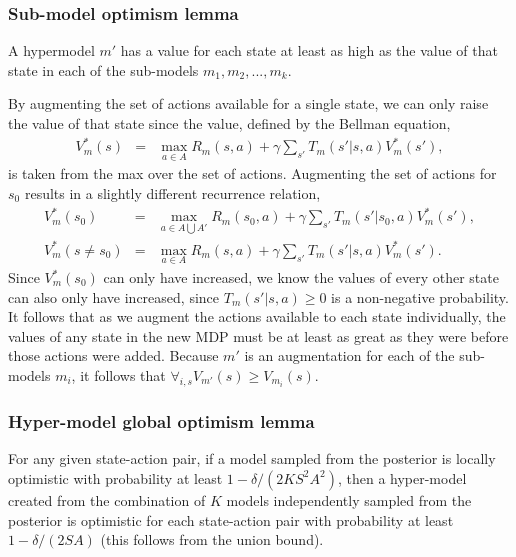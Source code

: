 \subsubsection{Sub-model optimism lemma}

\label{sec:boss:sub-model-optimism}


A hypermodel $m'$ has a value for each state at least as high as the value of that state in each of the sub-models $m_1, m_2, ..., m_k$.

By augmenting the set of actions available for a single state, we can only raise the value of that state since the value, defined by the Bellman equation,
\begin{eqnarray}
V^*_m(s) &=& \max_{a \in A} R_m(s,a)+\gamma \sum_{s'} T_m(s'|s,a)V^*_m(s'),
\end{eqnarray}
is taken from the max over the set of actions. Augmenting the set of actions for $s_0$ results in a slightly different recurrence relation,
\begin{eqnarray}
V^*_m(s_0) &=& \max_{a \in A \bigcup A'} R_m(s_0,a)+\gamma \sum_{s'} T_m(s'|s_0,a)V^*_m(s'),\\
V^*_m(s\neq s_0) &=& \max_{a \in A} R_m(s,a)+\gamma \sum_{s'} T_m(s'|s,a)V^*_m(s').
\end{eqnarray}
Since $V^*_m(s_0)$ can only have increased, we  know the values of every other state can also only have increased, since $T_m(s'|s,a) \geq 0$ is a non-negative probability. It follows that as we augment the actions available to each state individually, the values of any state in the new MDP must be at least as great as they were before those actions were added. Because $m'$ is an augmentation for each of the sub-models $m_i$, it follows that $\forall_{i,s} V_{m'}(s) \geq V_{m_i}(s)$.

\subsubsection{Hyper-model global optimism lemma}
\label{boss:alg:disc:proof:opt}

For any given state-action pair, if a model sampled from the posterior is locally optimistic with probability at least $1-\delta/(2 K S^2 A^2)$, then a hyper-model created from the combination of $K$ models independently sampled from the posterior is optimistic for each state-action pair with probability at least $1-\delta/(2 S A)$ (this follows from the union bound). 

